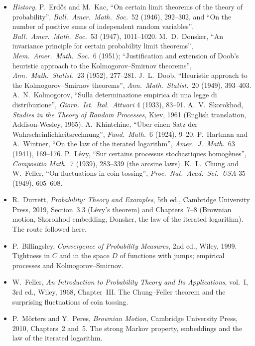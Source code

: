 \begin{itemize}
\item \emph{History.} P.~Erd\H{o}s and M.~Kac, ``On certain limit theorems of the theory of probability'', \emph{Bull.\ Amer.\ Math.\ Soc.}\ 52 (1946), 292--302, and ``On the number of
positive sums of independent random variables'', \emph{Bull.\ Amer.\ Math.\ Soc.}\ 53 (1947), 1011--1020. M.~D.~Donsker, ``An invariance principle for certain probability limit theorems'',
\emph{Mem.\ Amer.\ Math.\ Soc.}\ 6 (1951); ``Justification and extension of Doob's heuristic approach to the Kolmogorov--Smirnov theorems'', \emph{Ann.\ Math.\ Statist.}\ 23 (1952),
277--281. J.~L.~Doob, ``Heuristic approach to the Kolmogorov--Smirnov theorems'', \emph{Ann.\ Math.\ Statist.}\ 20 (1949), 393--403. A.~N.~Kolmogorov, ``Sulla determinazione empirica di una
legge di distribuzione'', \emph{Giorn.\ Ist.\ Ital.\ Attuari} 4 (1933), 83--91. A.~V.~Skorokhod, \emph{Studies in the Theory of Random Processes}, Kiev, 1961 (English translation,
Addison-Wesley, 1965). A.~Khintchine, ``\"Uber einen Satz der Wahrscheinlichkeitsrechnung'', \emph{Fund.\ Math.}\ 6 (1924), 9--20. P.~Hartman and A.~Wintner, ``On the law of the iterated
logarithm'', \emph{Amer.\ J.\ Math.}\ 63 (1941), 169--176. P.~L\'evy, ``Sur certains processus stochastiques homog\`enes'', \emph{Compositio Math.}\ 7 (1939), 283--339 (the arcsine laws).
K.~L.~Chung and W.~Feller, ``On fluctuations in coin-tossing'', \emph{Proc.\ Nat.\ Acad.\ Sci.\ USA} 35 (1949), 605--608.
\item R.~Durrett, \emph{Probability: Theory and Examples}, 5th ed., Cambridge University Press, 2019, Section~3.3 (L\'evy's theorem) and Chapters~7--8 (Brownian motion, Skorokhod embedding, Donsker, the
law of the iterated logarithm). The route followed here.
\item P.~Billingsley, \emph{Convergence of Probability Measures}, 2nd ed., Wiley, 1999. Tightness in $C$ and in the space $D$ of functions with jumps; empirical processes and
Kolmogorov--Smirnov.
\item W.~Feller, \emph{An Introduction to Probability Theory and Its Applications}, vol.~I, 3rd ed., Wiley, 1968, Chapter~III. The Chung--Feller theorem and the surprising
fluctuations of coin tossing.
\item P.~M\"orters and Y.~Peres, \emph{Brownian Motion}, Cambridge University Press, 2010, Chapters~2 and~5. The strong Markov property, embeddings and the law of the iterated logarithm.
\end{itemize}
